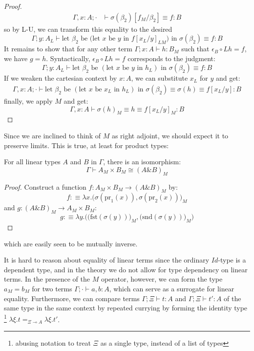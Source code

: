 \begin{thm}[$L \dashv M$]
\begin{proof}
\[\begin{split}
    \Gamma, x : A; \cdot &\vdash \sigma(\beta_2)[f_M / \beta_2] \equiv f : B
  \end{split}
\]
so by L-U, we can transform this equality to the desired
\[
\Gamma; y : A_L \vdash \text{let $\beta_2$ be (let $x$ be $y$ in $f[x_L/y]_{LM}$) in }\sigma(\beta_2) \equiv f : B
\]
  It remains to show that for any other term $\Gamma; x : A \vdash h : B_M$ such that $\epsilon_B \circ Lh = f$, we have $g = h$. Syntactically, $\epsilon_B \circ Lh = f$  corresponds to the judgment:
  \[
    \Gamma; y : A_L \vdash \text{let $\beta_2$ be $(\text{let $x$ be $y$ in $h_L$})$ in }\sigma(\beta_2) \equiv f : B
  \]
  If we weaken the cartesian context by $x : A$, we can substitute $x_L$ for $y$ and get:
  \[
    \begin{split}
      \Gamma, x : A; \cdot \vdash \text{let $\beta_2$ be $(\text{let $x$ be $x_L$ in $h_L$})$ in }\sigma(\beta_2) \equiv \sigma(h) \equiv f[x_L/y] : B
    \end{split}
    \]
    finally, we apply $M$ and get:
    \[
      \Gamma, x : A \vdash \sigma(h)_M \equiv h \equiv f[x_L/y]_M : B
    \]
\end{proof}
\end{thm}
Since we are inclined to think of $M$ as right adjoint, we should expect it to preserve limits. This is true, at least for product types:
\begin{thm}For all linear types $A$ and $B$ in $\Gamma$, there is an isomorphism:
  \[
    \Gamma \vdash A_M \times B_M \cong (A \& B)_M
  \]
  \begin{proof}
    Construct a function $f : A_M \times B_M \to (A \& B)_M$ by:
    \[
      f :\equiv \lambda x. \Big (\sigma(\text{pr}_1(x)), \sigma(\text{pr}_2(x))\Big)_M
    \]
    and $g : (A \& B)_M \to A_M \times B_M$:
    \[
      g :\equiv \lambda y. \Big (\big(\text{fst}(\sigma(y))\big )_M, \big (\text{snd}(\sigma(y))\big)_M \Big)
    \]
  \end{proof}
which are easily seen to be mutually inverse.
\end{thm}

It is hard to reason about equality of linear terms since the ordinary $Id$-type is a dependent type, and in the theory we do not allow for type dependency on linear terms. In the presence of the $M$ operator, however, we can form the type $a_M = b_M$ for two terms $\Gamma; \cdot \vdash a, b : A$, which can serve as a surrogate for linear equality. Furthermore, we can compare terms $\Gamma; \Xi \vdash t : A$ and $\Gamma; \Xi \vdash t' : A$ of the same type in the same context by repeated currying by forming the identity type \footnote{abusing notation to treat $\Xi$ as a single type, instead of a list of types} $\lambda \xi . t =_{\Xi \multimap A} \lambda \xi. t'$.


